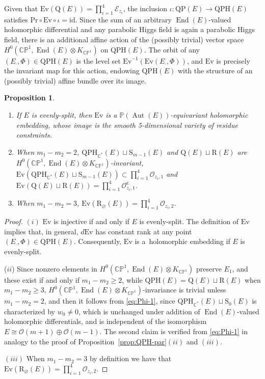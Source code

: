 \documentclass[pdftex]{sigma}
\newcommand{\field}[1]{\ensuremath{\mathbb{#1}}}
\newcommand{\CC}{\field{C}}
\newcommand{\PP}{\field{P}}
\newcommand{\calO}{\mathcal{O}}
\newcommand{\curly}[1]{\mathscr{#1}}
\newcommand{\cE}{\curly{E}}
\newcommand{\cO}{\curly{O}}
\newcommand{\qp}{\boldsymbol{\cdot}}
\DeclareMathOperator{\Aut}{Aut}
\DeclareMathOperator{\End}{End}
\numberwithin{equation}{section}
\newtheorem{Proposition}[Theorem]{Proposition}
 { \theoremstyle{definition}
\newtheorem{Definition}[Theorem]{Definition}
\newtheorem{Note}[Theorem]{Note}
\newtheorem{Example}[Theorem]{Example}
\newtheorem{Remark}[Theorem]{Remark} }
\begin{document}
Given that $\mathrm{Ev}(\mathrm{Q}(E))= \prod_{i=1}^{4}\cE_{z_{i}}$, the inclusion $\iota\colon \mathrm{QP}(E)\rightarrow \mathrm{QPH}(E)$ satisfies $\mathrm{Pr}\circ \mathrm{Ev}\circ\iota = \mathrm{id}$. Since the sum of an arbitrary $\End (E)$-valued holomorphic differential and any parabolic Higgs field is again a parabolic Higgs field, there is an additional affine action of the (possibly trivial) vector space $H^{0}(\CC\PP^{1},\End(E)\otimes K_{\CC\PP^{1}})$ on $\mathrm{QPH}(E)$. The orbit of any $(E_{\qp},\Phi)\in\mathrm{QPH}(E)$ is the level set $\mathrm{Ev}^{-1}(\mathrm{Ev}(E_{\qp},\Phi))$, and $\mathrm{Ev}$ is precisely the invariant map for this action, endowing $\mathrm{QPH}(E)$ with the structure of an (possibly trivial) affine bundle over its image.


\begin{Proposition}\label{prop:Ev}\quad
\begin{enumerate}\itemsep=0pt
\item[$(i)$] If $E$ is evenly-split, then $\mathrm{Ev}$ is a $\PP(\Aut (E))$-equivariant holomorphic embedding, whose image is the smooth 5-dimensional variety of residue constraints.
\item[$(ii)$] When $m_{1}-m_{2} = 2$, $\mathrm{QPH}_{\CC^{*}}(E)\sqcup\mathrm{S}_{m-1}(E)$ and $\mathrm{Q}(E)\sqcup\mathrm{R}(E)$ are $H^{0}(\CC\PP^{1},\End(E)\otimes K_{\CC\PP^{1}})$-invariant, $\mathrm{Ev}(\mathrm{QPH}_{\CC^{*}}(E)\sqcup\mathrm{S}_{m-1}(E))\subset \prod_{i=1}^{4}\cO_{z_{i},1}$ and $\mathrm{Ev}(\mathrm{Q}(E)\sqcup\mathrm{R}(E)) = \prod_{i=1}^{4}\cO^{\mathsf{c}}_{z_{i},1}$.
\item[$(iii)$] When $m_{1}-m_{2} = 3$, $\mathrm{Ev}(\mathrm{R}_{\varnothing }(E)) = \prod_{i=1}^{4}\cO_{z_{i},2}$.
\end{enumerate}
\end{Proposition}

\begin{proof}
$(i)$ $\mathrm{Ev}$ is injective if and only if $E$ is evenly-split. The definition of $\mathrm{Ev}$ implies that, in general, $d\mathrm{Ev}$ has constant rank at any point $(E_{\qp},\Phi)\in\mathrm{QPH}(E)$. Consequently, $\mathrm{Ev}$ is a~holomorphic embedding if $E$ is evenly-split.

($ii$) Since nonzero elements in $H^{0}(\CC\PP^{1},\End(E)\otimes K_{\CC\PP^{1}})$ preserve $E_{1}$, and these exist if and only if $m_{1}-m_{2}\geq 2$, while $\mathrm{QPH}(E) = \mathrm{Q}(E)\sqcup\mathrm{R}(E)$ when $m_{1}-m_{2}\geq 3$, $H^{0}(\CC\PP^{1},\End(E)\otimes K_{\CC\PP^{1}})$-invariance is trivial unless $m_{1}-m_{2}=2$, and then it follows from \eqref{eq:Phi-1}, since $\mathrm{QPH}_{\CC^{*}}(E)\sqcup \mathrm{S}_{0}(E)$ is characterized by $w_{0}\neq 0$, which is unchanged under addition of $\End(E)$-valued holomorphic differentials, and is independent of the isomorphism $E\cong\calO(m+1)\oplus\calO(m-1)$. The second claim is verified from \eqref{eq:Phi-1} in analogy to the proof of Proposition~\ref{prop:QPH-par}$(ii)$ and $(iii)$.

$(iii)$ When $m_{1}-m_{2}=3$ by definition we have that $\mathrm{Ev}(\mathrm{R}_{\varnothing }(E)) = \prod_{i=1}^{4}\cO_{z_{i},2}$.
\end{proof}
\end{document}

